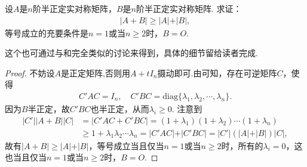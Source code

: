 \documentclass[../../main.tex]{subfiles}%
\begin{document}
\begin{proposition}\label{proposition:例9.76}
设\(A\)是\(n\)阶半正定实对称矩阵，\(B\)是\(n\)阶半正定实对称矩阵. 求证：
\begin{align*}
\vert A + B\vert\geqslant \vert A\vert+\vert B\vert,
\end{align*}
等号成立的充要条件是\(n = 1\)或当\(n\geqslant 2\)时，\(B = O\).
\end{proposition}
\begin{remark}
这个也可通过与和完全类似的讨论来得到，具体的细节留给读者完成. 
\end{remark}
\begin{proof}
不妨设$A$是正定矩阵,否则用$A+tI_n$摄动即可.由可知，存在可逆矩阵\(C\)，使得
\begin{align*}
C'AC = I_n,\quad C'BC = \mathrm{diag}\{\lambda_1,\lambda_2,\cdots,\lambda_n\}.
\end{align*}
因为\(B\)半正定，故\(C'BC\)也半正定，从而\(\lambda_i\geqslant 0\). 注意到
\begin{align*}
\vert C'\vert\vert A + B\vert\vert C\vert&=\vert C'AC + C'BC\vert=(1 + \lambda_1)(1 + \lambda_2)\cdots(1 + \lambda_n)\\
&\geqslant 1 + \lambda_1\lambda_2\cdots\lambda_n=\vert C'AC\vert+\vert C'BC\vert=\vert C'\vert(\vert A\vert+\vert B\vert)\vert C\vert,
\end{align*}
故有\(\vert A + B\vert\geqslant \vert A\vert+\vert B\vert\)，等号成立当且仅当\(n = 1\)或当\(n\geqslant 2\)时，所有的\(\lambda_i = 0\)，这也当且仅当\(n = 1\)或当\(n\geqslant 2\)时，\(B = O\).
\end{proof}
\end{document}
